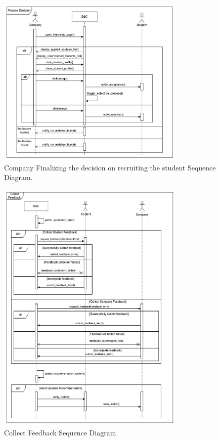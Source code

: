 \begin{figure}[H]
\centering
\includegraphics[width=0.8\textwidth]{Images/Finalize_Desicion_Sequence_Diagram.png}
\caption{\label{fig:metamodel9}Company Finalizing the decision on recruiting the student Sequence Diagram.}
\end{figure}

\begin{figure}[H]
\centering
\includegraphics[width=0.8\textwidth]{Images/Collect_Feedback_Sequence_Diagram.png}
\caption{\label{fig:metamodel9}Collect Feedback Sequence Diagram}
\end{figure}

